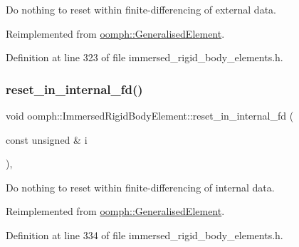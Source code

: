 Do nothing to reset within finite-\/differencing of external data. 



Reimplemented from \hyperlink{classoomph_1_1GeneralisedElement_a027a9213e91b946346062adf96e26a85}{oomph\+::\+Generalised\+Element}.



Definition at line 323 of file immersed\+\_\+rigid\+\_\+body\+\_\+elements.\+h.

\mbox{\label{classoomph_1_1ImmersedRigidBodyElement_a6e1d1fa9a6808691d6c067d45d108d2e}} 
\subsubsection{\texorpdfstring{reset\+\_\+in\+\_\+internal\+\_\+fd()}{reset\_in\_internal\_fd()}}
{\footnotesize\ttfamily void oomph\+::\+Immersed\+Rigid\+Body\+Element\+::reset\+\_\+in\+\_\+internal\+\_\+fd (\begin{DoxyParamCaption}\item[{const unsigned \&}]{i }\end{DoxyParamCaption})\hspace{0.3cm}{\ttfamily [inline]}, {\ttfamily [virtual]}}



Do nothing to reset within finite-\/differencing of internal data. 



Reimplemented from \hyperlink{classoomph_1_1GeneralisedElement_a89c6c5cf8b4d8b451caa124b346e5e8d}{oomph\+::\+Generalised\+Element}.



Definition at line 334 of file immersed\+\_\+rigid\+\_\+body\+\_\+elements.\+h.

\mbox{\label{classoomph_1_1ImmersedRigidBodyElement_adae3a4896f45d1fd08f3cd40fad0fdf4}} 
